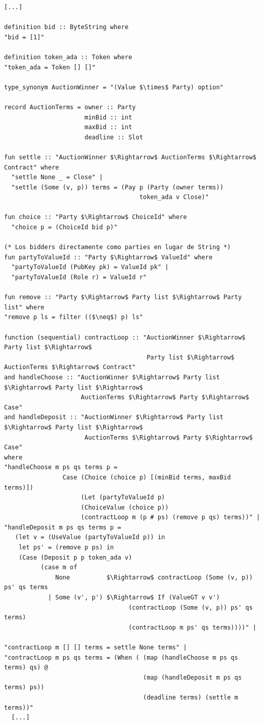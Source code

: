 \documentclass[12pt]{book}
\begin{document}
\newpage
\begin{lstlisting}[style=Isabelle]
[...]

definition bid :: ByteString where
"bid = [1]"

definition token_ada :: Token where
"token_ada = Token [] []"

type_synonym AuctionWinner = "(Value $\times$ Party) option"

record AuctionTerms = owner :: Party
                      minBid :: int
                      maxBid :: int
                      deadline :: Slot

fun settle :: "AuctionWinner $\Rightarrow$ AuctionTerms $\Rightarrow$ Contract" where
  "settle None _ = Close" |
  "settle (Some (v, p)) terms = (Pay p (Party (owner terms)) 
                                     token_ada v Close)"

fun choice :: "Party $\Rightarrow$ ChoiceId" where
  "choice p = (ChoiceId bid p)"

(* Los bidders directamente como parties en lugar de String *)
fun partyToValueId :: "Party $\Rightarrow$ ValueId" where
  "partyToValueId (PubKey pk) = ValueId pk" | 
  "partyToValueId (Role r) = ValueId r"

fun remove :: "Party $\Rightarrow$ Party list $\Rightarrow$ Party list" where
"remove p ls = filter (($\neq$) p) ls"

function (sequential) contractLoop :: "AuctionWinner $\Rightarrow$ Party list $\Rightarrow$
                                       Party list $\Rightarrow$ AuctionTerms $\Rightarrow$ Contract"
and handleChoose :: "AuctionWinner $\Rightarrow$ Party list $\Rightarrow$ Party list $\Rightarrow$
                     AuctionTerms $\Rightarrow$ Party $\Rightarrow$ Case"
and handleDeposit :: "AuctionWinner $\Rightarrow$ Party list $\Rightarrow$ Party list $\Rightarrow$ 
                      AuctionTerms $\Rightarrow$ Party $\Rightarrow$ Case" 
where
"handleChoose m ps qs terms p = 
                Case (Choice (choice p) [(minBid terms, maxBid terms)])
                     (Let (partyToValueId p)
                     (ChoiceValue (choice p))
                     (contractLoop m (p # ps) (remove p qs) terms))" |
"handleDeposit m ps qs terms p = 
   (let v = (UseValue (partyToValueId p)) in
    let ps' = (remove p ps) in
    (Case (Deposit p p token_ada v)
          (case m of
              None          $\Rightarrow$ contractLoop (Some (v, p)) ps' qs terms
            | Some (v', p') $\Rightarrow$ If (ValueGT v v') 
                                  (contractLoop (Some (v, p)) ps' qs terms) 
                                  (contractLoop m ps' qs terms))))" |

"contractLoop m [] [] terms = settle None terms" |
"contractLoop m ps qs terms = (When ( (map (handleChoose m ps qs terms) qs) @ 
                                      (map (handleDeposit m ps qs terms) ps)) 
                                      (deadline terms) (settle m terms))"  
  [...]
\end{lstlisting}
\end{document}
